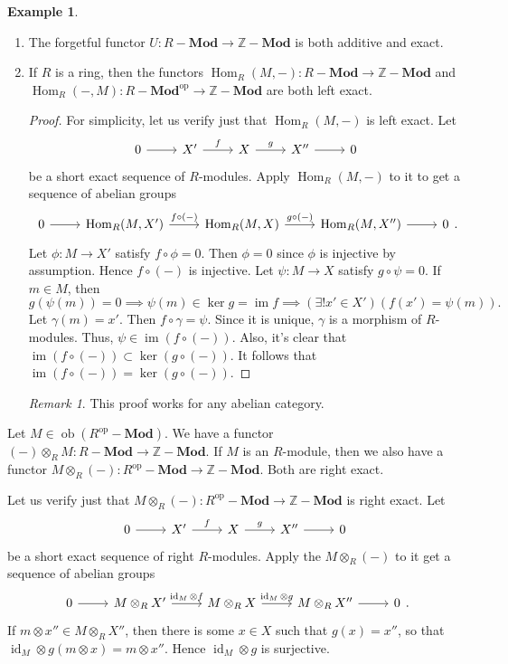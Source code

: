 \documentclass[10pt,letterpaper,cm]{nupset}
\theoremstyle{definition}
\newtheorem{exmp}[definition]{Example}
\theoremstyle{theorem}
\theoremstyle{remark}
\newtheorem{remark}[definition]{Remark}
\newcommand{\Z}{\mathbb Z}
\newcommand{\1}{\mathbf{1}}
\newcommand{\0}{\vec 0}
\DeclareMathOperator{\id}{\mathrm{id}}
\DeclareMathOperator{\op}{op}
\DeclareMathOperator{\im}{im}
\DeclareMathOperator{\ob}{ob}
\DeclareMathOperator{\Hom}{Hom}
\begin{document}
\begin{exmp} $ $
\begin{enumerate}
\item  The forgetful functor $U : R{-}\mathbf{Mod} \to \Z{-}\mathbf{Mod}$ is both additive and exact.
\item If $R$ is a ring, then the functors $\Hom_R(M, -) : R{-}\mathbf{Mod} \to \Z{-}\mathbf{Mod}$ and $\Hom_R(-, M) :R{-}\mathbf{Mod}^{\op} \to \Z{-} \mathbf{Mod}$ are both left exact.
\begin{proof}
For simplicity, let us verify just that $\Hom_R(M, -)$ is left exact. Let 
\[
\begin{tikzcd}
0 \arrow[r] & X' \arrow[r, "f"] & X \arrow[r, "g"] & X'' \arrow[r] & 0
\end{tikzcd} 
\] be a short exact sequence of $R$-modules. Apply $\Hom_R(M, -)$ to it to get a sequence of abelian groups
\[
\begin{tikzcd}
0 \arrow[r] & {\Hom_R(M, X')} \arrow[r, "f\circ (-)"] & {\Hom_R(M,X)} \arrow[r, "g\circ (-)"] & {\Hom_R(M, X'')} \arrow[r] & 0
\end{tikzcd}
.\]
Let $\phi : M \to X'$ satisfy $f \circ \phi = 0$. Then $\phi =0$ since $\phi$ is injective by assumption. Hence $f \circ (-)$ is injective.  Let $\psi : M \to X$ satisfy $g \circ \psi =0$. If $m \in M$, then $$g(\psi(m)) =0 \implies \psi(m) \in \ker{g} = \im f \implies \left(\exists!x' \in X'\right)\left(f(x') = \psi(m)\right).$$ Let $\gamma(m) = x'.$ Then $f \circ \gamma  = \psi$. Since it is unique, $\gamma$ is a morphism of $R$-modules. Thus, $\psi \in \im(f \circ (-))$. Also, it's clear that $\im(f \circ (-)) \subset \ker(g \circ (-))$. It follows that $\im(f \circ (-)) = \ker(g \circ (-))$.
\end{proof}
\begin{remark}
This proof works for any abelian category.
\end{remark}
\end{enumerate}
\end{exmp}

\medskip

Let $M \in \ob(R^{\op}{-}\mathbf{Mod})$. We have a functor $(-) \otimes_R M : R{-}\mathbf{Mod} \to \Z {-}\mathbf{Mod}$. If $M$ is an $R$-module, then we also have a functor $M \otimes_R (-) : R^{\op}{-}\mathbf{Mod} \to \Z{-}\mathbf{Mod}$. Both are right exact.

Let us verify just that $M \otimes_R (-) : R^{\op}{-}\mathbf{Mod} \to \Z{-}\mathbf{Mod}$ is right exact.  Let 
\[
\begin{tikzcd}
0 \arrow[r] & X' \arrow[r, "f"] & X \arrow[r, "g"] & X'' \arrow[r] & 0
\end{tikzcd} 
\] be a short exact sequence of  right $R$-modules. Apply the $M \otimes_R (-)$ to it get a sequence of abelian groups
\[
\begin{tikzcd}
0 \arrow[r] & M\otimes_R X' \arrow[r, "\id_M \otimes f"] & M\otimes_R X \arrow[r, "\id_M \otimes g"] & M\otimes_R X'' \arrow[r] & 0
\end{tikzcd}.
\]
If $ m \otimes x'' \in M \otimes_R X''$, then there is some $x \in X$ such that $g(x) = x''$, so that $\id_M \otimes g(m \otimes x) = m\otimes x''$. Hence $\id_M \otimes g$ is surjective. 
\end{document}
